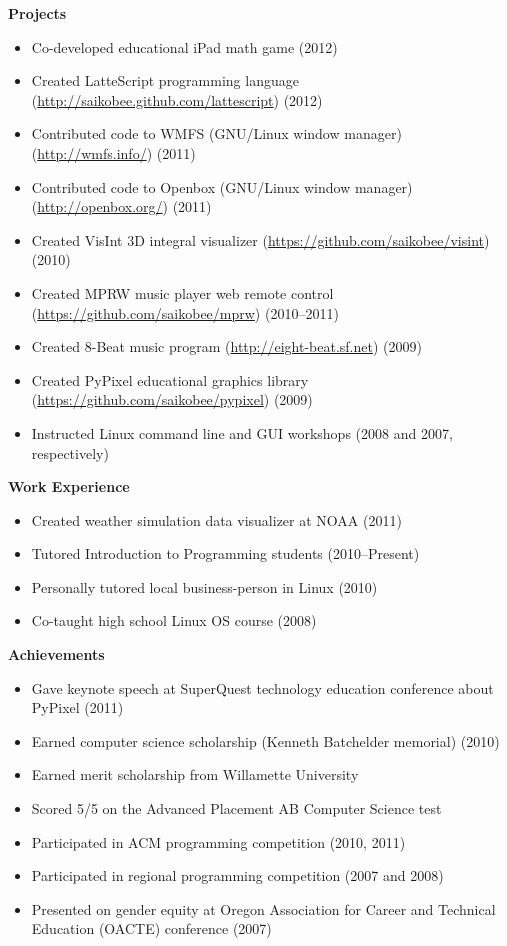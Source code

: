 \documentclass[10pt]{article}
\begin{document}
\medskip
\noindent \textbf{Projects} \hrulefill
\begin{itemize}
\item Co-developed educational iPad math game (2012)
\item Created LatteScript programming language
    (\url{http://saikobee.github.com/lattescript}) (2012)
\item Contributed code to WMFS (GNU/Linux window manager)
    (\url{http://wmfs.info/}) (2011)
\item Contributed code to Openbox (GNU/Linux window manager)
    (\url{http://openbox.org/}) (2011)
\item Created VisInt 3D integral visualizer
    (\url{https://github.com/saikobee/visint}) (2010)
\item Created MPRW music player web remote control
    (\url{https://github.com/saikobee/mprw}) (2010\---2011)
\item Created 8-Beat music program
    (\url{http://eight-beat.sf.net}) (2009)
\item Created PyPixel educational graphics library
    (\url{https://github.com/saikobee/pypixel}) (2009)
\item Instructed Linux command line and GUI workshops (2008 and 2007, respectively)
\end{itemize}

\medskip
\noindent \textbf{Work Experience} \hrulefill
\begin{itemize}
\item Created weather simulation data visualizer at NOAA (2011)
\item Tutored Introduction to Programming students (2010\---Present)
\item Personally tutored local business-person in Linux (2010)
\item Co-taught high school Linux OS course (2008)
\end{itemize}

\medskip
\noindent \textbf{Achievements} \hrulefill
\begin{itemize}
\item Gave keynote speech at SuperQuest technology education conference about
PyPixel (2011)
\item Earned computer science scholarship (Kenneth Batchelder memorial) (2010)
\item Earned merit scholarship from Willamette University
\item Scored 5/5 on the Advanced Placement AB Computer Science test
\item Participated in ACM programming competition (2010, 2011)
\item Participated in regional programming competition (2007 and 2008)
\item Presented on gender equity at Oregon Association for Career and
Technical Education (OACTE) conference (2007)
\end{itemize}
\end{document}
